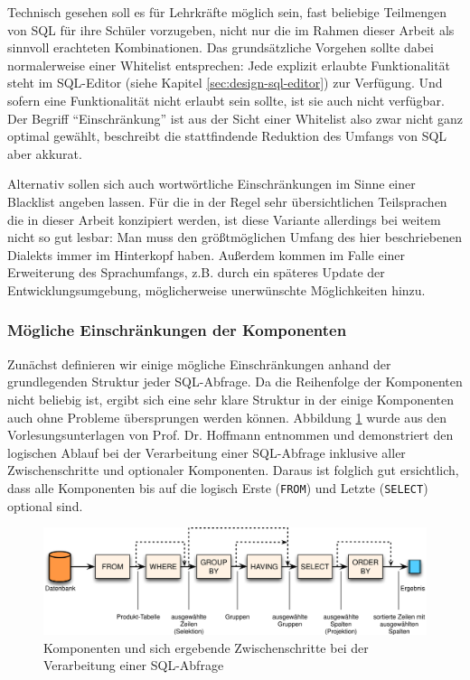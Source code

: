 Technisch gesehen soll es für Lehrkräfte möglich sein, fast beliebige Teilmengen von SQL für ihre Schüler vorzugeben, nicht nur die im Rahmen dieser Arbeit als sinnvoll erachteten Kombinationen. Das grundsätzliche Vorgehen sollte dabei normalerweise einer Whitelist entsprechen: Jede explizit erlaubte Funktionalität steht im SQL-Editor (siehe Kapitel \ref{sec:design-sql-editor}) zur Verfügung. Und sofern eine Funktionalität nicht erlaubt sein sollte, ist sie auch nicht verfügbar. Der Begriff ``Einschränkung'' ist aus der Sicht einer Whitelist also zwar nicht ganz optimal gewählt, beschreibt die stattfindende Reduktion des Umfangs von SQL aber akkurat.

Alternativ sollen sich auch wortwörtliche Einschränkungen im Sinne einer Blacklist angeben lassen. Für die in der Regel sehr übersichtlichen Teilsprachen die in dieser Arbeit konzipiert werden, ist diese Variante allerdings bei weitem nicht so gut lesbar: Man muss den größtmöglichen Umfang des hier beschriebenen Dialekts immer im Hinterkopf haben. Außerdem kommen im Falle einer Erweiterung des Sprachumfangs, z.B. durch ein späteres Update der Entwicklungsumgebung, möglicherweise unerwünschte Möglichkeiten hinzu.

\subsubsection{Mögliche Einschränkungen der Komponenten}
\label{sec:sql-subset-local}

Zunächst definieren wir einige mögliche Einschränkungen anhand der grundlegenden Struktur jeder SQL-Abfrage. Da die Reihenfolge der Komponenten nicht beliebig ist, ergibt sich eine sehr klare Struktur in der einige Komponenten auch ohne Probleme übersprungen werden können. Abbildung \ref{fig:sql-steps} wurde aus den Vorlesungsunterlagen von Prof. Dr. Hoffmann entnommen und demonstriert den logischen Ablauf bei der Verarbeitung einer SQL-Abfrage inklusive aller Zwischenschritte und optionaler Komponenten. Daraus ist folglich gut ersichtlich, dass alle Komponenten bis auf die logisch Erste (\texttt{FROM}) und Letzte (\texttt{SELECT}) optional sind.

\begin{figure}
  \centering \includegraphics{images/sql-steps.png}
  \caption{Komponenten und sich ergebende Zwischenschritte bei der Verarbeitung einer SQL-Abfrage}
  \label{fig:sql-steps}
\end{figure}

